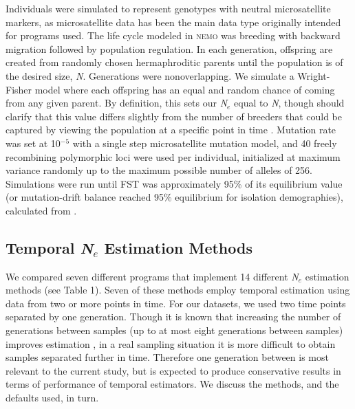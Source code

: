 Individuals were simulated to represent genotypes with neutral microsatellite markers, as 
microsatellite data has been the main data type originally intended for programs used. The 
life cycle modeled in \textsc{nemo} was breeding with backward migration followed by population 
regulation. In each generation, offspring are created from randomly chosen hermaphroditic parents 
until the population is of the desired size, \emph{N}. Generations were nonoverlapping. We simulate 
a Wright-Fisher model where each offspring has an equal and random chance of coming from any given 
parent. By definition, this sets our \emph{N}$_e$ equal to \emph{N}, though should clarify that 
this value differs slightly from the number of breeders that could be captured by viewing the population 
at a specific point in time \citep{Waples:2009}. Mutation rate was set at 10$^{-5}$ with a single 
step microsatellite mutation model, and 40 freely recombining polymorphic loci were used per individual, 
initialized at maximum variance randomly up to the maximum possible number of alleles of 256. Simulations 
were run until FST was approximately 95\% of its equilibrium value (or mutation-drift balance reached 95\% 
equilibrium for isolation demographies), calculated from \citet{Whitlock:1992}.

\subsection{Temporal \emph{N}$_e$ Estimation Methods}
We compared seven different programs that implement 14 different \emph{N}$_e$ estimation 
methods (see Table 1). Seven of these methods employ temporal estimation using data from two 
or more points in time. For our datasets, we used two time points separated by one generation. 
Though it is known that increasing the number of generations between samples (up to at most eight 
generations between samples) improves estimation \citep{Wang:2003}, in a real sampling 
situation it is more difficult to obtain samples separated further in time. Therefore one generation 
between is most relevant to the current study, but is expected to produce conservative results 
in terms of performance of temporal estimators. We discuss the methods, and the defaults used, in turn.

